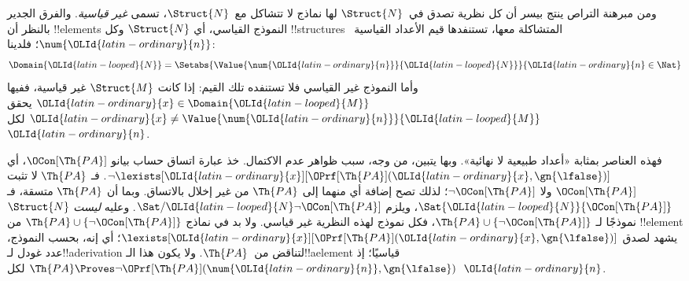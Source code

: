 \documentclass[../../../include/open-logic-section]{subfiles}
\begin{document}
ومن مبرهنة التراص ينتج بيسر أن كل نظرية تصدق في~$\Struct{N}$
لها نماذج لا تتشاكل مع~$\Struct{N}$، تسمى \emph{غير قياسية}.
والفرق الجدير بالنظر أن !!{element}s النموذج القياسي، أي
$\Struct{N}$ وكل !!{structure}s المتشاكلة معها، تستنفدها قيم
الأعداد القياسية~$\num{{\OLId{latin-ordinary}{n}}}$؛ فلدينا:
\[
\Domain{{\OLId{latin-looped}{N}}} = \Setabs{\Value{\num{{\OLId{latin-ordinary}{n}}}}{{\OLId{latin-looped}{N}}}}{{\OLId{latin-ordinary}{n}} \in \Nat}
\]
وأما النموذج غير القياسي فلا تستنفده تلك القيم: إذا كانت
$\Struct{M}$ غير قياسية، ففيها ${\OLId{latin-ordinary}{x}} \in \Domain{{\OLId{latin-looped}{M}}}$ يحقق
${\OLId{latin-ordinary}{x}} \neq \Value{\num{{\OLId{latin-ordinary}{n}}}}{{\OLId{latin-looped}{M}}}$ لكل~${\OLId{latin-ordinary}{n}}$.

فهذه العناصر بمثابة «أعداد طبيعية لا نهائية». وبها يتبين،
من وجه، سبب ظواهر عدم الاكتمال. خذ عبارة اتساق حساب بيانو
$\OCon[\Th{PA}]$، أي
$\lnot \lexists[{\OLId{latin-ordinary}{x}}][\OPrf[\Th{PA}]({\OLId{latin-ordinary}{x}}, \gn{\lfalse})]$.
فـ $\Th{PA}$ لا تثبت $\OCon[\Th{PA}]$ ولا $\lnot \OCon[\Th{PA}]$؛
لذلك تصح إضافة أي منهما إلى $\Th{PA}$ من غير إخلال بالاتساق.
وبما أن $\Th{PA}$ متسقة، فـ $\Sat{{\OLId{latin-looped}{N}}}{\OCon[\Th{PA}]}$،
ويلزم $\Sat/{{\OLId{latin-looped}{N}}}{\lnot \OCon[\Th{PA}]}$. وعليه \emph{ليست}
$\Struct{N}$ نموذجًا لـ $\Th{PA} \cup \{\lnot \OCon[\Th{PA}]\}$،
فكل نموذج لهذه النظرية غير قياسي. ولا بد في نماذج
$\Th{PA} \cup \{\lnot \OCon[\Th{PA}]\}$ من !!{element} يشهد
لصدق $\lexists[{\OLId{latin-ordinary}{x}}][\OPrf[\Th{PA}]({\OLId{latin-ordinary}{x}},\gn{\lfalse})]$؛ أي إنه،
بحسب النموذج، عدد غودل لـ!!a{derivation} لتناقض من~$\Th{PA}$.
ولا يكون هذا الـ!!a{element} قياسيًا؛ إذ
$\Th{PA} \Proves \lnot \OPrf[\Th{PA}](\num{{\OLId{latin-ordinary}{n}}}, \gn{\lfalse})$
لكل~${\OLId{latin-ordinary}{n}}$.
\end{document}
